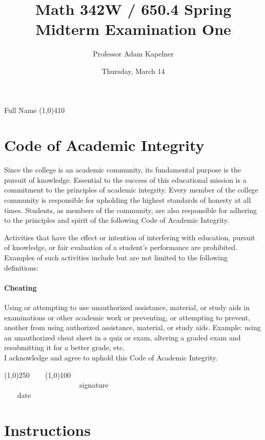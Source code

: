 \documentclass[12pt]{article}
\title{Math 342W / 650.4 Spring \the\year \\ Midterm Examination One}
\author{Professor Adam Kapelner}
\date{Thursday, March 14}
\begin{document}
\maketitle

\noindent Full Name \line(1,0){410}

\thispagestyle{empty}

\section*{Code of Academic Integrity}

\footnotesize
Since the college is an academic community, its fundamental purpose is the pursuit of knowledge. Essential to the success of this educational mission is a commitment to the principles of academic integrity. Every member of the college community is responsible for upholding the highest standards of honesty at all times. Students, as members of the community, are also responsible for adhering to the principles and spirit of the following Code of Academic Integrity.

Activities that have the effect or intention of interfering with education, pursuit of knowledge, or fair evaluation of a student's performance are prohibited. Examples of such activities include but are not limited to the following definitions:

\paragraph{Cheating} Using or attempting to use unauthorized assistance, material, or study aids in examinations or other academic work or preventing, or attempting to prevent, another from using authorized assistance, material, or study aids. Example: using an unauthorized cheat sheet in a quiz or exam, altering a graded exam and resubmitting it for a better grade, etc.
\\

\noindent I acknowledge and agree to uphold this Code of Academic Integrity. \\

\begin{center}
\line(1,0){250} ~~~ \line(1,0){100}\\
~~~~~~~~~~~~~~~~~~~~~signature~~~~~~~~~~~~~~~~~~~~~~~~~~~~~~~~~~~~~~~~~~~~~ date
\end{center}

\normalsize

\section*{Instructions}
\end{document}
